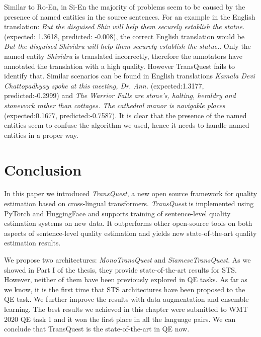 Similar to Ro-En, in Si-En the majority of problems seem to be caused by the presence of named entities in the source sentences. For an example in the English translation: \emph{But the disguised Shiv will help them securely establish the statue.
} (expected: 1.3618, predicted: -0.008), the correct English translation would be \emph{But the disguised Shividru will help them securely establish the statue.}. Only the named entity \emph{Shividru} is translated incorrectly, therefore the annotators have annotated the translation with a high quality. However TransQuest fails to identify that. Similar scenarios can be found in English translations \emph{Kamala Devi Chattopadhyay spoke at this meeting, Dr. Ann.} (expected:1.3177, predicted:-0.2999) and \emph{The Warrior Falls are stone's, halting, heraldry and stonework rather than cottages. The cathedral manor is navigable places} (expected:0.1677, predicted:-0.7587). It is clear that the presence of the named entities seem to confuse the algorithm we used, hence it needs to handle named entities in a proper way.


\section{Conclusion}
\label{sec:transquest_conclusion}
In this paper we introduced \textit{TransQuest}, a new open source framework for quality estimation based on cross-lingual transformers. \textit{TransQuest} is implemented using PyTorch \autocite{NEURIPS2019_9015} and HuggingFace \autocite{wolf-etal-2020-transformers} and supports training of sentence-level quality estimation systems on new data. It outperforms other open-source tools on both aspects of sentence-level quality estimation and yields new state-of-the-art quality estimation results. 


We propose two architectures: \textit{MonoTransQuest} and \textit{SiameseTransQuest}. As we showed in Part I of the thesis, they provide state-of-the-art results for STS. However, neither of them have been previously explored in QE tasks. As far as we know, it is the first time that STS architectures have been proposed to the QE task. We further improve the results with data augmentation and ensemble learning. The best results we achieved in this chapter were submitted to WMT 2020 QE task 1 and it won the first place in all the language pairs. We can conclude that TransQuest is the state-of-the-art in QE now.

